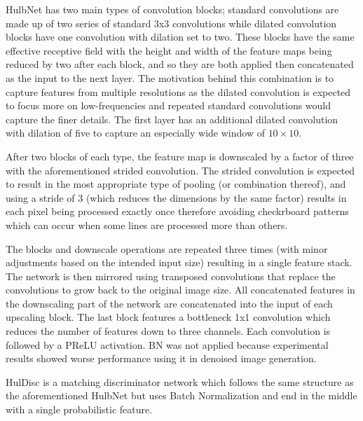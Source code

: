 HulbNet has two main types of convolution blocks; standard convolutions are made up of two series of standard 3x3 convolutions while dilated convolution blocks have one convolution with dilation set to two. These blocks have the same effective receptive field with the height and width of the feature maps being reduced by two after each block, and so they are both applied then concatenated as the input to the next layer. The motivation behind this combination is to capture features from multiple resolutions as the dilated convolution is expected to focus more on low-frequencies and repeated standard convolutions would capture the finer details. The first layer has an additional dilated convolution with dilation of five to capture an especially wide window of $10\times 10$.

After two blocks of each type, the feature map is downscaled by a factor of three with the aforementioned strided convolution. The strided convolution is expected to result in the most appropriate type of pooling (or combination thereof), and using a stride of 3 (which reduces the dimensions by the same factor) results in each pixel being processed exactly once therefore avoiding checkrboard patterns which can occur when some lines are processed more than others.

The blocks and downscale operations are repeated three times (with minor adjustments based on the intended input size) resulting in a single feature stack. The network is then mirrored using transposed convolutions that replace the convolutions to grow back to the original image size. All concatenated features in the downscaling part of the network are concatenated into the input of each upscaling block. The last block features a bottleneck 1x1 convolution which reduces the number of features down to three channels.
Each convolution is followed by a \ac{PReLU} activation. \acl{BN} was not applied because experimental results showed worse performance using it in denoised image generation.

HulDisc is a matching discriminator network which follows the same structure as the aforementioned HulbNet but uses Batch Normalization and end in the middle with a single probabilistic feature. %
